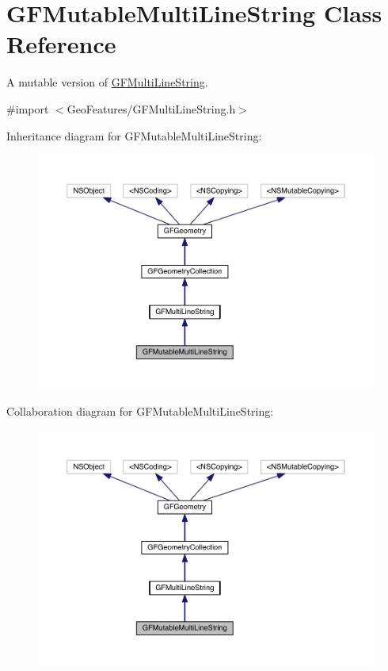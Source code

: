 \hypertarget{interface_g_f_mutable_multi_line_string}{}\section{G\+F\+Mutable\+Multi\+Line\+String Class Reference}
\label{interface_g_f_mutable_multi_line_string}


A mutable version of \hyperlink{interface_g_f_multi_line_string}{G\+F\+Multi\+Line\+String}.  




{\ttfamily \#import $<$Geo\+Features/\+G\+F\+Multi\+Line\+String.\+h$>$}



Inheritance diagram for G\+F\+Mutable\+Multi\+Line\+String\+:
\nopagebreak
\begin{figure}[H]
\begin{center}
\leavevmode
\includegraphics[width=350pt]{interface_g_f_mutable_multi_line_string__inherit__graph}
\end{center}
\end{figure}


Collaboration diagram for G\+F\+Mutable\+Multi\+Line\+String\+:
\nopagebreak
\begin{figure}[H]
\begin{center}
\leavevmode
\includegraphics[width=350pt]{interface_g_f_mutable_multi_line_string__coll__graph}
\end{center}
\end{figure}
